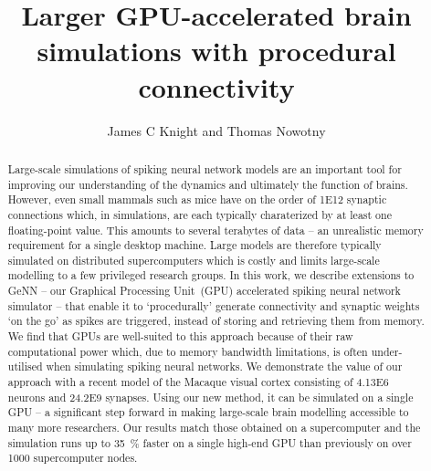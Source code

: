 \documentclass[9pt,a4paper]{amsart}
\title{Larger GPU-accelerated brain simulations with procedural connectivity}
\author{James C Knight and Thomas Nowotny}
\begin{document}
\begin{abstract}
Large-scale simulations of spiking neural network models are an important tool for improving our understanding of the dynamics and ultimately the function of brains.
However, even small mammals such as mice have on the order of \num{1E12} synaptic connections which, in simulations, are each typically charaterized by at least one floating-point value.
This amounts to several terabytes of data -- an unrealistic memory requirement for a single desktop machine.
Large models are therefore typically simulated on distributed supercomputers which is costly and limits large-scale modelling to a few privileged research groups.
In this work, we describe extensions to GeNN -- our Graphical Processing Unit~(GPU) accelerated spiking neural network simulator -- that enable it to `procedurally' generate connectivity and synaptic weights `on the go' as spikes are triggered, instead of storing and retrieving them from memory.
We find that GPUs are well-suited to this approach because of their raw computational power which, due to memory bandwidth limitations, is often under-utilised when simulating spiking neural networks.
We demonstrate the value of our approach with a recent model of the Macaque visual cortex consisting of \num{4.13E6} neurons and \num{24.2E9} synapses.
Using our new method, it can be simulated on a single GPU -- a significant step forward in making large-scale brain modelling accessible to many more researchers.
Our results match those obtained on a supercomputer and the simulation runs up to \SI{35}{\percent} faster on a single high-end GPU than previously on over 1000 supercomputer nodes.
\end{abstract}
\maketitle
\end{document}
